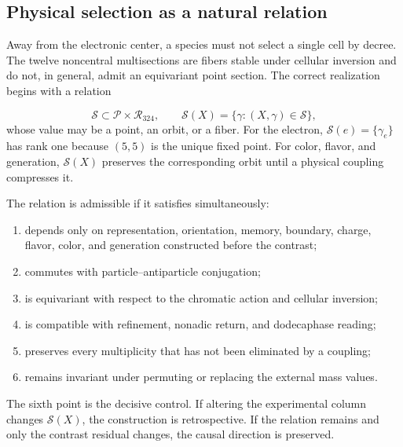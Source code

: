\subsection{Physical selection as a natural relation}
Away from the electronic center, a species must not select a single cell by decree. The twelve noncentral multisections are fibers stable under cellular inversion and do not, in general, admit an equivariant point section. The correct realization begins with a relation

\[
\mathscr S\subset \mathcal P\times\mathcal R_{324},
\qquad
\mathscr S(X)=\{\gamma:(X,\gamma)\in\mathscr S\},
\]
whose value may be a point, an orbit, or a fiber. For the electron, \(\mathscr S(e)=\{\gamma_e\}\) has rank one because \((5,5)\) is the unique fixed point. For color, flavor, and generation, \(\mathscr S(X)\) preserves the corresponding orbit until a physical coupling compresses it.

The relation is admissible if it satisfies simultaneously:

\begin{enumerate}
\item depends only on representation, orientation, memory, boundary, charge,
flavor, color, and generation constructed before the contrast;

\item commutes with particle--antiparticle conjugation;
\item is equivariant with respect to the chromatic action and cellular inversion;
\item is compatible with refinement, nonadic return, and dodecaphase reading;
\item preserves every multiplicity that has not been eliminated by a coupling;
\item remains invariant under permuting or replacing the external mass values.
\end{enumerate}
The sixth point is the decisive control. If altering the experimental column changes \(\mathscr S(X)\), the construction is retrospective. If the relation remains and only the contrast residual changes, the causal direction is preserved.

